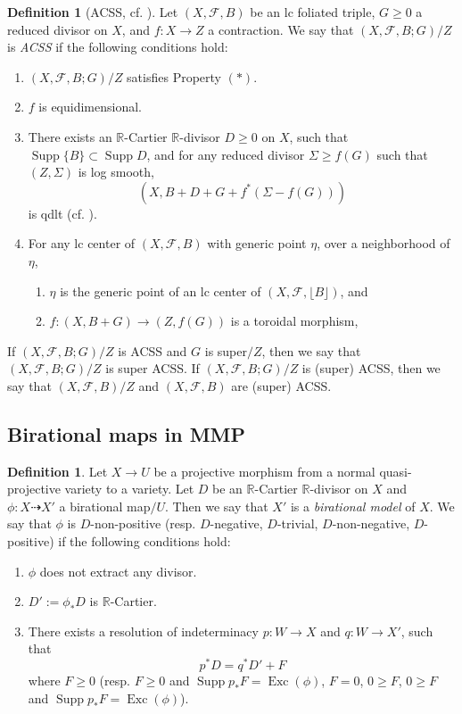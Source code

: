 \documentclass[11pt]{amsart}
\numberwithin{equation}{section}
\newcommand{\Rr}{\mathbb{R}}
\newcommand{\Exc}{\operatorname{Exc}}
\newcommand{\Supp}{\operatorname{Supp}}
\newcommand{\Ff}{\mathcal{F}}
\theoremstyle{definition}
\newtheorem{defn}[thm]{Definition}
\theoremstyle{definition}
\theoremstyle{definition}
\begin{document}
\begin{defn}[ACSS, {cf. \cite[Definitions 5.4.2, 7.2.2, 7.2.3]{CHLX23}}]\label{defn: ACSS f-triple}
Let $(X,\Ff,B)$ be an lc foliated triple, $G\geq 0$ a reduced divisor on $X$, and $f: X\rightarrow Z$ a contraction. We say that $(X,\Ff,B;G)/Z$ is \emph{ACSS} if the following conditions hold:
\begin{enumerate}    
\item $(X,\Ff,B;G)/Z$ satisfies Property $(*)$.
\item $f$ is equidimensional.
\item There exists an $\Rr$-Cartier $\Rr$-divisor $D\geq 0$ on $X$, such that  $\Supp\{B\}\subset\Supp D$, and for any reduced divisor $\Sigma\geq f(G)$ such that $(Z,\Sigma)$ is log smooth, $$(X,B+D+G+f^*(\Sigma-f(G)))$$ 
      is qdlt (cf. \cite[Definition 35]{dFKX17}).
\item For any lc center of $(X,\Ff,B)$ with generic point $\eta$, over a neighborhood of $\eta$,
    \begin{enumerate}
      \item $\eta$ is the generic point of an lc center of $(X,\Ff,\lfloor B\rfloor)$, and
       \item $f: (X,B+G)\rightarrow (Z,f(G))$ is a toroidal morphism,
    \end{enumerate}
\end{enumerate}
If  $(X,\Ff,B;G)/Z$ is ACSS and $G$ is super$/Z$, then we say that $(X,\Ff,B;G)/Z$ is super ACSS. If $(X,\Ff,B;G)/Z$ is (super) ACSS, then we say that $(X,\Ff,B)/Z$ and $(X,\Ff,B)$ are (super) ACSS.
\end{defn}

\subsection{Birational maps in MMP}

\begin{defn}
    Let $X\rightarrow U$ be a projective morphism from a normal quasi-projective variety to a variety.  Let $D$ be an $\Rr$-Cartier $\Rr$-divisor on $X$ and $\phi: X\dashrightarrow X'$ a birational map$/U$. Then we say that $X'$ is a \emph{birational model} of $X$. We say that $\phi$ is $D$-non-positive (resp. $D$-negative, $D$-trivial, $D$-non-negative, $D$-positive) if the following conditions hold:
    \begin{enumerate}
    \item $\phi$ does not extract any divisor.
    \item $D':=\phi_*D$ is $\Rr$-Cartier.
    \item There exists a resolution of indeterminacy $p: W\rightarrow X$ and $q: W\rightarrow X'$, such that
    $$p^*D=q^*D'+F$$
    where $F\geq 0$ (resp. $F\geq 0$ and $\Supp p_*F=\Exc(\phi)$, $F=0$, $0\geq F$, $0\geq F$ and $\Supp p_*F=\Exc(\phi)$).
    \end{enumerate}
\end{defn}
\end{document}
